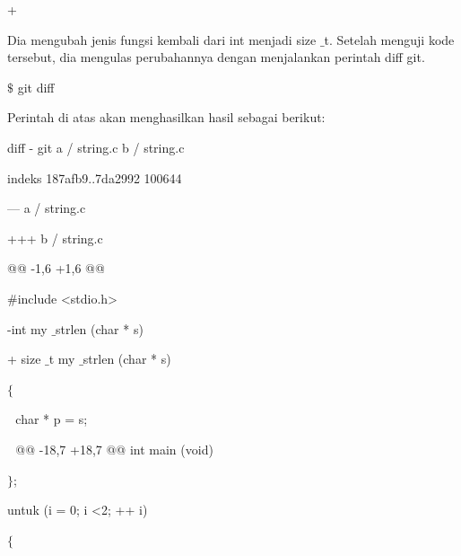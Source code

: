 \noindent 
 \hspace*{0.5in} + \par
 \vspace{\baselineskip}
\noindent 
Dia mengubah jenis fungsi kembali dari int menjadi size $  \_  $t. Setelah menguji kode tersebut, dia mengulas perubahannya dengan menjalankan perintah diff git. \par
\vspace{\baselineskip}
\noindent 
 \hspace*{0.5in}  $  \$  $ git diff \par
\noindent 
Perintah di atas akan menghasilkan hasil sebagai berikut: \par
\noindent 
 \hspace*{0.5in} diff - git a / string.c b / string.c \par
\noindent 
 \hspace*{0.5in} indeks 187afb9..7da2992 100644 \par
\noindent 
 \hspace*{0.5in} --- a / string.c \par
\noindent 
 \hspace*{0.5in} +++ b / string.c \par
\noindent 
 \hspace*{0.5in} @@ -1,6 +1,6 @@ \par
\noindent 
 \hspace*{0.5in}  $  \#  $include <stdio.h> \par
\noindent 
 \hspace*{0.5in} -int my $  \_  $strlen (char * s) \par
\noindent 
 \hspace*{0.5in} + size $  \_  $t my $  \_  $strlen (char * s) \par
\noindent 
 \hspace*{0.5in}  $  \{  $ \par
\noindent 
 \hspace*{0.5in}  $  $ $  $ $  $char * p = s; \par
\noindent 
 \hspace*{0.5in}  $  $ $  $ $  $@@ -18,7 +18,7 @@ int main (void) \par
\noindent 
 \hspace*{0.5in}  $  \}  $; \par
\noindent 
 \hspace*{0.5in} untuk (i = 0; i <2; ++ i) \par
\noindent 
 \hspace*{0.5in}  $  \{  $ \par
